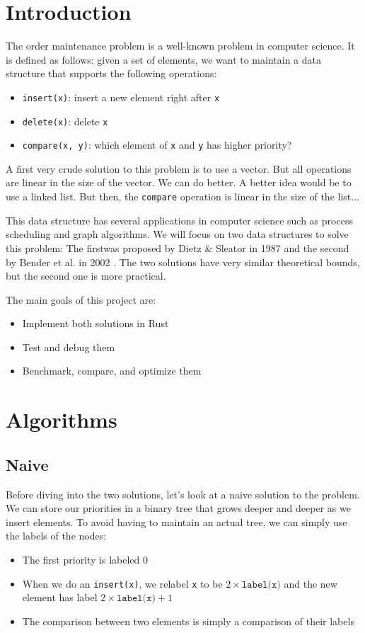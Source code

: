 \documentclass[12pt]{article}
\begin{document}
\newpage
\section{Introduction}

The order maintenance problem is a well-known problem in computer science. It is defined as follows: given a set of elements, we want to maintain a data structure that supports the following operations:
\begin{itemize}
	\item \texttt{insert(x)}: insert a new element right after \texttt{x}
	\item \texttt{delete(x)}: delete \texttt{x}
	\item \texttt{compare(x, y)}: which element of \texttt{x} and \texttt{y} has higher priority?
\end{itemize}

A first very crude solution to this problem is to use a vector. But all operations are linear in the size of the vector. We can do better.
A better idea would be to use a linked list. But then, the \texttt{compare} operation is linear in the size of the list...

This data structure has several applications in computer science such as process scheduling and graph algorithms.
We will focus on two data structures to solve this problem: The firstwas proposed by Dietz \& Sleator in 1987 \cite{10.1145/28395.28434} and the second by Bender et al. in 2002 \cite{10.5555/647912.740822}.
The two solutions have very similar theoretical bounds, but the second one is more practical.

The main goals of this project are:
\begin{itemize}
	\item Implement both solutions in Rust
	\item Test and debug them
	\item Benchmark, compare, and optimize them
\end{itemize}

\newpage
\section{Algorithms}

\subsection{Naive}

Before diving into the two solutions, let's look at a naive solution to the problem.
We can store our priorities in a binary tree that grows deeper and deeper as we insert elements.
To avoid having to maintain an actual tree, we can simply use the labels of the nodes:
\begin{itemize}
	\item The first priority is labeled 0
	\item When we do an \texttt{insert(x)}, we relabel \texttt{x} to be $2 \times \texttt{label(x)}$ and the new element has label $2 \times \texttt{label(x)} + 1$
	\item The comparison between two elements is simply a comparison of their labels
\end{itemize}
\end{document}

